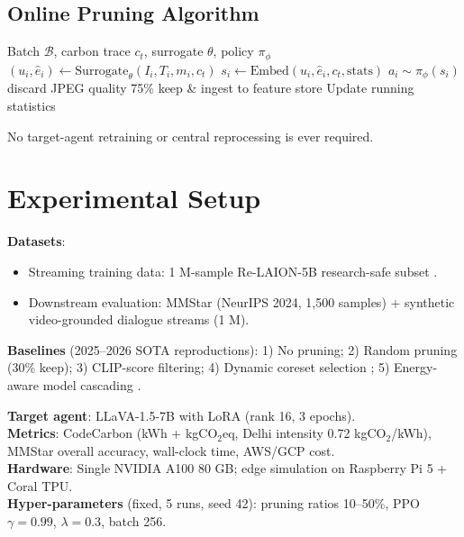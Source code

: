 \subsection{Online Pruning Algorithm}
\begin{algorithm}[t]
\caption{EcoAgentOps Streaming Pruning}
\begin{algorithmic}[1]
\REQUIRE Batch $\mathcal{B}$, carbon trace $c_t$, surrogate $\theta$, policy $\pi_\phi$
    \STATE $(u_i, \hat{e}_i) \leftarrow \text{Surrogate}_\theta(I_i,T_i,m_i,c_t)$
    \STATE $s_i \leftarrow \text{Embed}(u_i,\hat{e}_i,c_t,\text{stats})$
    \STATE $a_i \sim \pi_\phi(s_i)$
        \STATE discard
        \STATE JPEG quality 75\%
    \ELSE
        \STATE keep \& ingest to feature store
    \ENDIF
\ENDFOR
\STATE Update running statistics
\end{algorithmic}
\end{algorithm}

No target-agent retraining or central reprocessing is ever required.

\section{Experimental Setup}
\textbf{Datasets}: 
\begin{itemize}
    \item Streaming training data: 1 M-sample Re-LAION-5B research-safe subset \cite{b9}.
    \item Downstream evaluation: MMStar (NeurIPS 2024, 1,500 samples) \cite{b1} + synthetic video-grounded dialogue streams (1 M).
\end{itemize}

\textbf{Baselines} (2025--2026 SOTA reproductions):
1) No pruning; 2) Random pruning (30\% keep); 3) CLIP-score filtering; 4) Dynamic coreset selection \cite{b2, b4}; 5) Energy-aware model cascading \cite{b3}.

\textbf{Target agent}: LLaVA-1.5-7B with LoRA (rank 16, 3 epochs). \\
\textbf{Metrics}: CodeCarbon \cite{b10} (kWh + kgCO$_2$eq, Delhi intensity 0.72 kgCO$_2$/kWh), MMStar overall accuracy, wall-clock time, AWS/GCP cost. \\
\textbf{Hardware}: Single NVIDIA A100 80 GB; edge simulation on Raspberry Pi 5 + Coral TPU. \\
\textbf{Hyper-parameters} (fixed, 5 runs, seed 42): pruning ratios 10--50\%, PPO $\gamma=0.99$, $\lambda=0.3$, batch 256.

